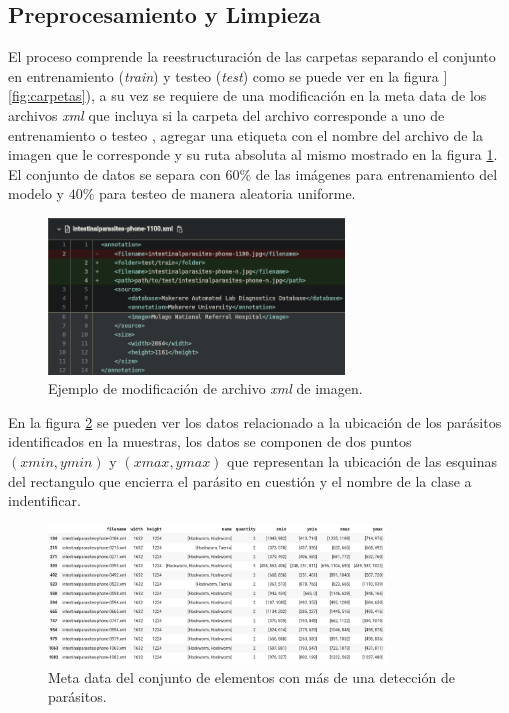 \documentclass[letter,12pt]{report}
\begin{document}
\subsection{Preprocesamiento y Limpieza}
El proceso comprende la reestructuración de las carpetas separando el conjunto en
entrenamiento (\textit{train}) y testeo (\textit{test}) como se puede ver en la figura 
]\ref{fig:carpetas}), a su vez se requiere de una modificación en la meta data de los archivos
\textit{xml} que incluya si la carpeta del archivo corresponde a uno de entrenamiento o testeo
, agregar una etiqueta con el nombre del archivo de la imagen que le corresponde y su ruta
absoluta al mismo mostrado en la figura \ref{fig:diff}. El conjunto de datos se separa con
$60\%$ de las imágenes para entrenamiento del modelo y $40\%$ para testeo de manera aleatoria
uniforme.

\begin{figure}[H]
    \centering
    \includegraphics[width=0.7\textwidth]{diff}
    \caption{Ejemplo de modificación de archivo \textit{xml} de imagen.}
    \label{fig:diff}
\end{figure}

En la figura \ref{fig:dataFrame} se pueden ver los datos relacionado a la ubicación de los
parásitos identificados en la muestras, los datos se componen de dos puntos $(xmin, ymin)$ y
$(xmax, ymax)$ que representan la ubicación de las esquinas del rectangulo que encierra el
parásito en cuestión y el nombre de la clase a indentificar.

\begin{figure}[ht]
    \centering
    \includegraphics[width=0.8\textwidth]{dataFrame}
    \caption{Meta data del conjunto de elementos con más de una detección de parásitos.}
    \label{fig:dataFrame}
\end{figure}
\end{document}
